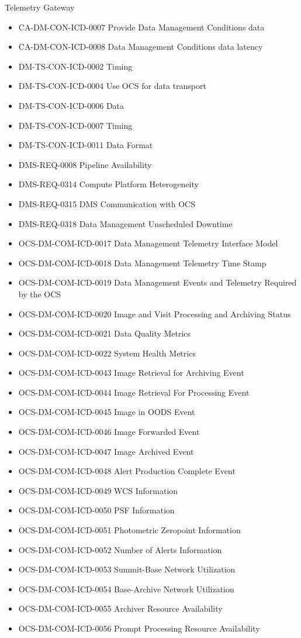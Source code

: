 Telemetry Gateway \begin{itemize}
\item CA-DM-CON-ICD-0007 Provide Data Management Conditions data
\item CA-DM-CON-ICD-0008 Data Management Conditions data latency
\item DM-TS-CON-ICD-0002 Timing
\item DM-TS-CON-ICD-0004 Use OCS for data transport
\item DM-TS-CON-ICD-0006 Data
\item DM-TS-CON-ICD-0007 Timing
\item DM-TS-CON-ICD-0011 Data Format
\item DMS-REQ-0008 Pipeline Availability
\item DMS-REQ-0314 Compute Platform Heterogeneity
\item DMS-REQ-0315 DMS Communication with OCS
\item DMS-REQ-0318 Data Management Unscheduled Downtime
\item OCS-DM-COM-ICD-0017 Data Management Telemetry Interface Model
\item OCS-DM-COM-ICD-0018 Data Management Telemetry Time Stamp
\item OCS-DM-COM-ICD-0019 Data Management Events and Telemetry Required by the OCS
\item OCS-DM-COM-ICD-0020 Image and Visit Processing and Archiving Status
\item OCS-DM-COM-ICD-0021 Data Quality Metrics
\item OCS-DM-COM-ICD-0022 System Health Metrics
\item OCS-DM-COM-ICD-0043 Image Retrieval for Archiving Event
\item OCS-DM-COM-ICD-0044 Image Retrieval For Processing Event
\item OCS-DM-COM-ICD-0045 Image in OODS Event
\item OCS-DM-COM-ICD-0046 Image Forwarded Event
\item OCS-DM-COM-ICD-0047 Image Archived Event
\item OCS-DM-COM-ICD-0048 Alert Production Complete Event
\item OCS-DM-COM-ICD-0049 WCS Information
\item OCS-DM-COM-ICD-0050 PSF Information
\item OCS-DM-COM-ICD-0051 Photometric Zeropoint Information
\item OCS-DM-COM-ICD-0052 Number of Alerts Information
\item OCS-DM-COM-ICD-0053 Summit-Base Network Utilization
\item OCS-DM-COM-ICD-0054 Base-Archive Network Utilization
\item OCS-DM-COM-ICD-0055 Archiver Resource Availability
\item OCS-DM-COM-ICD-0056 Prompt Processing Resource Availability
\end{itemize}
